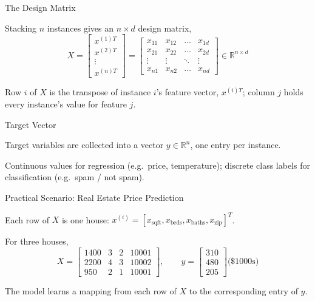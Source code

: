 \begin{frame}{The Design Matrix}
    \begin{sitemize}
        \item Stacking $n$ instances gives an $n \times d$ design matrix,
        $$X = \begin{bmatrix} x^{(1)T} \\ x^{(2)T} \\ \vdots \\ x^{(n)T} \end{bmatrix} = \begin{bmatrix} x_{11} & x_{12} & \dots & x_{1d} \\ x_{21} & x_{22} & \dots & x_{2d} \\ \vdots & \vdots & \ddots & \vdots \\ x_{n1} & x_{n2} & \dots & x_{nd} \end{bmatrix} \in \mathbb{R}^{n \times d}$$
        \item Row $i$ of $X$ is the transpose of instance $i$'s feature vector, $x^{(i)T}$; column $j$ holds every instance's value for feature $j$.
    \end{sitemize}
\end{frame}


\begin{frame}{Target Vector}
    \begin{sitemize}
        \item Target variables are collected into a vector $y \in \mathbb{R}^n$, one entry per instance.
        \item Continuous values for regression (e.g.\ price, temperature); discrete class labels for classification (e.g.\ spam / not spam).
    \end{sitemize}
\end{frame}


\begin{frame}{Practical Scenario: Real Estate Price Prediction}
    \begin{sitemize}
        \item Each row of $X$ is one house: $x^{(i)} = [x_{\text{sqft}}, x_{\text{beds}}, x_{\text{baths}}, x_{\text{zip}}]^T$.
        \item For three houses,
        $$X = \begin{bmatrix} 1400 & 3 & 2 & 10001 \\ 2200 & 4 & 3 & 10002 \\ 950 & 2 & 1 & 10001 \end{bmatrix}, \qquad y = \begin{bmatrix} 310 \\ 480 \\ 205 \end{bmatrix} \text{(\$1000s)}$$
        \item The model learns a mapping from each row of $X$ to the corresponding entry of $y$.
    \end{sitemize}
\end{frame}


